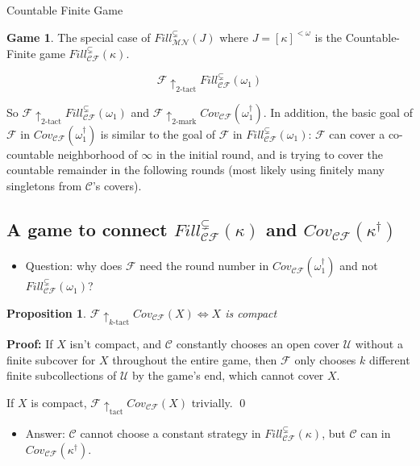 \documentclass{beamer}
\theoremstyle{theorem}
\newtheorem{proposition}[theorem]{Proposition}
\theoremstyle{definition}
\newtheorem{game}[theorem]{Game}
\newcommand{\tactwin}{\uparrow_{\text{tact}}}
\newcommand{\ktactwin}[1]{\uparrow_{#1\text{-tact}}}
\newcommand{\kmarkwin}[1]{\uparrow_{#1\text{-mark}}}
\newcommand{\oneptlind}[1]{#1^\dagger}
\newcommand{\mengame}[1]{Cov_{\pl C\pl F}(#1)}
\newcommand{\sfillgame}[1]{Fill^{\subsetneq}_{\pl M\pl N}(#1)}
\newcommand{\ksfillgame}[1]{Fill^{\subsetneq}_{\pl C\pl F}(#1)}
\newcommand{\<}{\langle}
\renewcommand{\>}{\rangle}
\newcommand{\mc}[1]{\mathcal{#1}}
\newcommand{\pl}[1]{\mathscr{#1}}
\begin{document}
\begin{frame}{Countable Finite Game}

  \begin{game}
    The special case of $\sfillgame{J}$ where $J=[\kappa]^{<\omega}$ is the Countable-Finite game $\ksfillgame{\kappa}$.
  \end{game}

  \pause

  \begin{corollary}
    \[\pl F\ktactwin{2}\ksfillgame{\omega_1}\]
  \end{corollary}

  \pause

  So $\pl F\ktactwin{2}\ksfillgame{\omega_1}$ and $\pl F\kmarkwin{2}\mengame{\oneptlind{\omega_1}}$. In addition, the basic goal of $\pl F$ in $\mengame{\oneptlind{\omega_1}}$ is similar to the goal of $\pl F$ in $\ksfillgame{\omega_1}$: $\pl F$ can cover a co-countable neighborhood of $\infty$ in the initial round, and is trying to cover the countable remainder in the following rounds (most likely using finitely many singletons from $\pl C$'s covers).
\end{frame}

\subsection{A game to connect $\ksfillgame{\kappa}$ and $\mengame{\oneptlind{\kappa}}$}

\begin{frame}

  \begin{itemize}
    \item Question: why does $\pl F$ need the round number in $\mengame{\oneptlind{\omega_1}}$ and not $\ksfillgame{\omega_1}$?
  \end{itemize}

  \pause

  \begin{proposition}
    $\pl F \ktactwin{k} \mengame{X} \Leftrightarrow X$ is compact
  \end{proposition}

  \textbf{Proof:}
    If $X$ isn't compact, and $\pl C$ constantly chooses an open cover $\mc U$ without a finite subcover for $X$ throughout the entire game, then $\pl F$ only chooses $k$ different finite subcollections of $\mc U$ by the game's end, which cannot cover $X$.

    \vspace{12pt}

    If $X$ is compact, $\pl F \tactwin \mengame{X}$ trivially. \qed

    \pause

    \begin{itemize}
      \item Answer: $\pl C$ cannot choose a constant strategy in $\ksfillgame{\kappa}$, but $\pl C$ can in $\mengame{\oneptlind{\kappa}}$.
    \end{itemize}

\end{frame}
\end{document}
